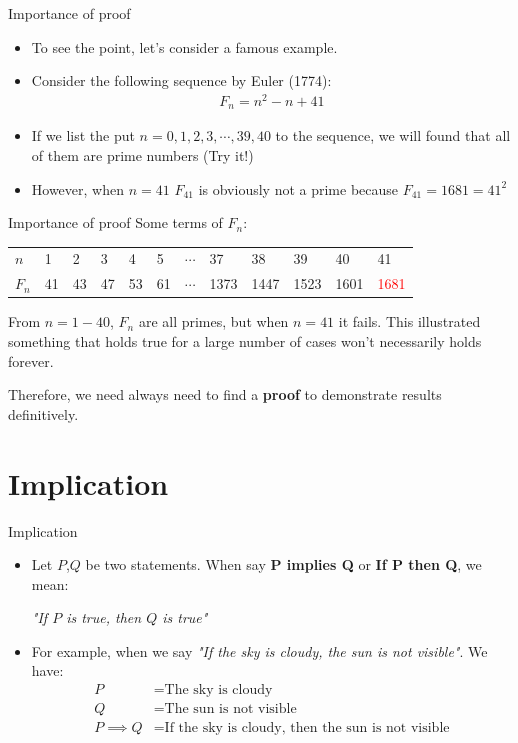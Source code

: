 \documentclass[10pt,xcolor={table,dvipsnames},t]{beamer}
\begin{document}
\begin{frame}{Importance of proof}
  \begin{itemize}
    \item To see the point, let's consider a famous example.
    \item Consider the following sequence by Euler (1774):
    \begin{align*}
      F_n = n^2 - n + 41
    \end{align*}
    \item If we list the put $n=0,1,2,3,\cdots, 39, 40$ to the sequence, we will found that all of them are prime numbers (Try it!)
    \item However, when $n=41$ $F_{41}$ is obviously not a prime because $F_{41} = 1681 = 41^2$ 
  \end{itemize}
\end{frame}

\begin{frame}{Importance of proof}
  Some terms of $F_n$:
  \begin{table}[]
    \begin{tabular}{llllllllllll}
    $n$   & 1  & 2  & 3  & 4  & 5  & $\cdots$ & 37   & 38   & 39   & 40   & 41   \\
    $F_n$ & 41 & 43 & 47 & 53 & 61 & $\cdots$ & 1373 & 1447 & 1523 & 1601 & \textcolor{red}{1681}
    \end{tabular}
    \end{table}
  From $n=1-40$, $F_n$ are all primes, but when $n=41$ it fails. This illustrated something that holds true for a large number of cases won't necessarily holds forever.

  \vspace{0.5cm}

  Therefore, we need always need to find a \textbf{proof} to demonstrate results definitively.
\end{frame}

\section{Implication}
\begin{frame}{Implication}
  \begin{itemize}
    \item Let $P$,$Q$ be two statements. When say \textbf{P implies Q} or \textbf{If P then Q}, we mean:
    \begin{center}
      \textit{"If $P$ is true, then $Q$ is true"}
    \end{center}
    \item For example, when we say \textit{"If the sky is cloudy, the sun is not visible"}. We have:
    \begin{align*}
      P &= \text{The sky is cloudy}\\
      Q &= \text{The sun is not visible}\\
      P\implies Q &= \text{If the sky is cloudy, then the sun is not visible}
    \end{align*}
  \end{itemize}
\end{frame}
\end{document}
